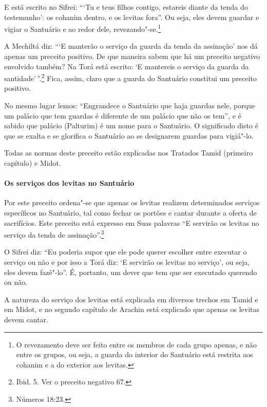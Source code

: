 \begin{multicols}{2}
E está escrito no Sifrei\starr: ```Tu e teus filhos contigo, estareis diante
da tenda do testemunho': os cohanim\starr{} dentro, e os levitas\starr{} fora''. Ou
seja, eles devem guardar e vigiar o Santuário e ao redor dele,
revezando"-se.\footnote{O revezamento deve ser feito entre os membros de cada grupo apenas, e
  não entre os grupos, ou seja, a guarda do interior do Santuário está
  restrita aos cohanim\starr{} e a do exterior aos levitas\starr.}

A Mechiltá\starr{} diz: ```E manterão o serviço da guarda da tenda da assinação'
nos dá apenas um preceito positivo. De que maneira sabem que há um
preceito negativo envolvido também? Na Torá\starr{} está escrito: `E mantereis
o serviço da guarda da santidade'\,''.\footnote{Ibid. 5. Ver o preceito negativo 67.} Fica, assim, claro que a guarda do Santuário constitui um preceito positivo.

No mesmo lugar lemos: ``Engrandece o Santuário que haja guardas nele,
porque um palácio que tem guardas é diferente de um palácio que não os
tem'', e é sabido que palácio (Palturim) é um nome para o Santuário. O
significado disto é que se exalta e se glorifica o Santuário ao se
designarem guardas para vigiá"-lo.

Todas as normas deste preceito estão explicadas nos Tratados Tamid\starr{}
(primeiro capítulo) e Midot\starr.

\paragraph{Os serviços dos levitas\starr{} no Santuário}

Por este preceito ordena"-se que apenas os levitas\starr{} realizem determinados
serviços específicos no Santuário, tal como fechar os portões e cantar
durante a oferta de sacrifícios. Este preceito está expresso em Suas
palavras ``E servirão os levitas\starr{} no serviço da tenda de assinação''.\footnote{Números 18:23.}

O Sifrei\starr{} diz: ``Eu poderia supor que ele pode querer escolher entre
executar o serviço ou não e por isso a Torá\starr{} diz: `E servirão os levitas\starr{}
no serviço', ou seja, eles devem fazê"-lo''. É, portanto, um dever que
tem que ser executado querendo ou não.

A natureza do serviço dos levitas\starr{} está explicada em diversos trechos em
Tamid\starr{} e em Midot\starr, e no segundo capítulo de Arachin\star{} está explicado que
apenas os levitas\starr{} devem cantar.


\end{multicols}
